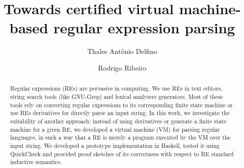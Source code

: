 \documentclass[sigplan]{acmart}
\theoremstyle{definition}
\begin{document}
\title{Towards certified virtual machine-based regular expression parsing}

\author{Thales Ant\^onio Delfino}
\author{Rodrigo Ribeiro}
\begin{abstract}
Regular expressions (REs) are pervasive in computing. We use REs in text editors, string search tools
(like GNU-Grep) and lexical analysers generators. Most of these tools rely on converting regular
expressions to its corresponding finite state machine or use REs derivatives for directly parse an
input string. In this work, we investigate the suitability of another approach: instead of
using derivatives or generate a finite state machine for a given RE, we developed a virtual machine
(VM) for parsing regular languages, in such a way that a RE is merely a program executed by the VM
over the input string. We developed a prototype implementation in Haskell, tested it using QuickCheck and
provided proof sketches of its correctness with respect to RE standard inductive semantics.
\end{abstract}

%
%
\end{document}
